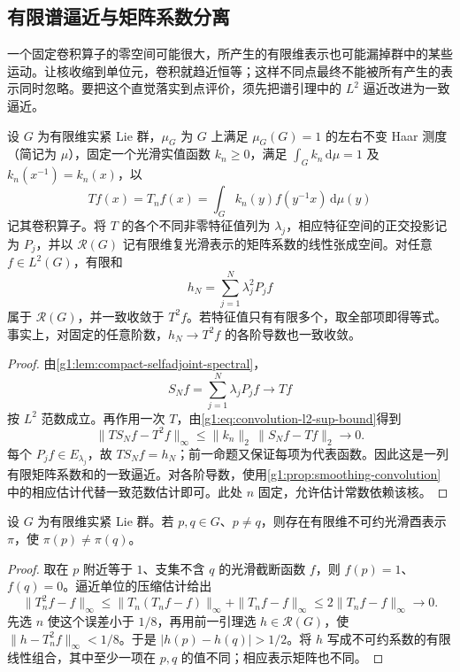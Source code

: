 \subsection{有限谱逼近与矩阵系数分离}
\label{g1:subsec:2002:05}
一个固定卷积算子的零空间可能很大，所产生的有限维表示也可能漏掉群中的某些运动。让核收缩到单位元，卷积就趋近恒等；这样不同点最终不能被所有产生的表示同时忽略。要把这个直觉落实到点评价，须先把谱引理中的 \(L^2\) 逼近改进为一致逼近。

\begin{lemma}\label{g1:lem:smoothed-spectral-approximation}
	设 \(G\) 为有限维实紧 Lie 群，\(\mu_G\) 为 \(G\) 上满足 \(\mu_G(G)=1\) 的左右不变 Haar 测度（简记为 \(\mu\)），固定一个光滑实值函数 \(k_n\ge0\)，满足 \(\int_Gk_n\,\mathrm{d}\mu=1\) 及 \(k_n(x^{-1})=k_n(x)\)，以
	\[
		Tf(x)=T_nf(x)=\int_G k_n(y)f(y^{-1}x)\,\mathrm{d}\mu(y)
	\]
	记其卷积算子。将 \(T\) 的各个不同非零特征值列为 \(\lambda_j\)，相应特征空间的正交投影记为 \(P_j\)，并以 \(\mathcal R(G)\) 记有限维复光滑表示的矩阵系数的线性张成空间。对任意 \(f\in L^2(G)\)，有限和
	\[
		h_N=\sum_{j=1}^N\lambda_j^2P_jf
	\]
	属于 \(\mathcal R(G)\)，并一致收敛于 \(T^2f\)。若特征值只有有限多个，取全部项即得等式。事实上，对固定的任意阶数，\(h_N\to T^2f\) 的各阶导数也一致收敛。
\end{lemma}
\begin{proof}
	由\cref{g1:lem:compact-selfadjoint-spectral}，
	\[
		S_Nf=\sum_{j=1}^N\lambda_jP_jf\longrightarrow Tf
	\]
	按 \(L^2\) 范数成立。再作用一次 \(T\)，由\eqref{g1:eq:convolution-l2-sup-bound}得到
	\begin{equation}\label{g1:eq:smoothed-spectral-sup-error}
		\|TS_Nf-T^2f\|_\infty
		\le\|k_n\|_2\,\|S_Nf-Tf\|_2\longrightarrow0.
	\end{equation}
	每个 \(P_jf\in E_{\lambda_j}\)，故 \(TS_Nf=h_N\)；前一命题又保证每项为代表函数。因此这是一列有限矩阵系数和的一致逼近。对各阶导数，使用\cref{g1:prop:smoothing-convolution}中的相应估计代替一致范数估计即可。此处 \(n\) 固定，允许估计常数依赖该核。
\end{proof}

\begin{corollary}\label{g1:cor:matrix-coefficients-separate-points}
	设 \(G\) 为有限维实紧 Lie 群。若 \(p,q\in G\)、\(p\ne q\)，则存在有限维不可约光滑酉表示 \(\pi\)，使 \(\pi(p)\ne\pi(q)\)。
\end{corollary}
\begin{proof}
	取在 \(p\) 附近等于 \(1\)、支集不含 \(q\) 的光滑截断函数 \(f\)，则 \(f(p)=1\)、\(f(q)=0\)。逼近单位的压缩估计给出
	\[
		\|T_n^2f-f\|_\infty
		\le\|T_n(T_nf-f)\|_\infty+\|T_nf-f\|_\infty
		\le2\|T_nf-f\|_\infty\longrightarrow0.
	\]
	先选 \(n\) 使这个误差小于 \(1/8\)，再用前一引理选 \(h\in\mathcal R(G)\)，使 \(\|h-T_n^2f\|_\infty<1/8\)。于是 \(|h(p)-h(q)|>1/2\)。将 \(h\) 写成不可约系数的有限线性组合，其中至少一项在 \(p,q\) 的值不同；相应表示矩阵也不同。
\end{proof}

